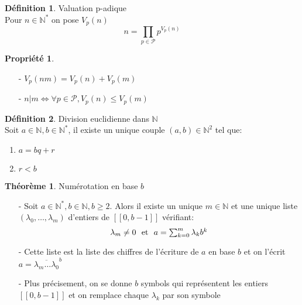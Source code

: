 \documentclass[fleqn]{article}
\theoremstyle{definition} \newtheorem*{defi}{D\'efinition}
\theoremstyle{definition} \newtheorem*{theo}{Th\'eor\`eme}
\theoremstyle{definition} \newtheorem*{coro}{Corollaire}
\theoremstyle{remark} \newtheorem*{rqs}{Remarques}
\theoremstyle{definition} \newtheorem*{prop}{Propri\'et\'e}
\begin{document}
\begin{defi} Valuation p-adique \\
	Pour $n \in \mathbb{N}^*$ on pose $V_p(n)$ \\
		\[n = \prod_{p \in \mathcal{P}} p^{V_p(n)}\]
\end{defi}
\begin{prop} $ $
	\begin{itemize}
		\item [-] $V_p(nm) = V_p(n) + V_p(m)$
		\item [-] $n|m \Leftrightarrow \forall p \in \mathcal{P}, V_p(n) \leq V_p(m)$
	\end{itemize}
\end{prop}

\begin{defi} Division euclidienne dans $\mathbb{N}$ \\
	Soit $a \in \mathbb{N}, b \in \mathbb{N}^*$, il existe un unique couple $(a,b) \in \mathbb{N}^2$ tel que:
	\begin{enumerate}
		\item $a = bq + r$
		\item $r < b$
	\end{enumerate}
\end{defi}

\begin{theo} Num\'erotation en base $b$
	\begin{itemize}
		\item [-] Soit $a \in \mathbb{N}^*, b \in \mathbb{N}, b \geq 2$. Alors il existe un unique $m \in \mathbb{N}$ et une unique
			liste $(\lambda_0, \hdots, \lambda_m)$ d'entiers de $[\![0,b-1]\!]$ v\'erifiant:
			\[\lambda_m \neq 0$ \text{ et } $a = \sum_{k=0}^m \lambda_k b^k\]
		\item [-] Cette liste est la liste des chiffres de l'\'ecriture de $a$ en base $b$ et on l'\'ecrit $a =
			\overline{\lambda_m \hdots \lambda_0}^b$
		\item [-] Plus pr\'ecisement, on se donne $b$ symbols qui repr\'esentent les entiers \mbox{$[\![0,b-1]\!]$} et on remplace
			chaque $\lambda_k$ par son symbole
	\end{itemize}
\end{theo}
\end{document}

